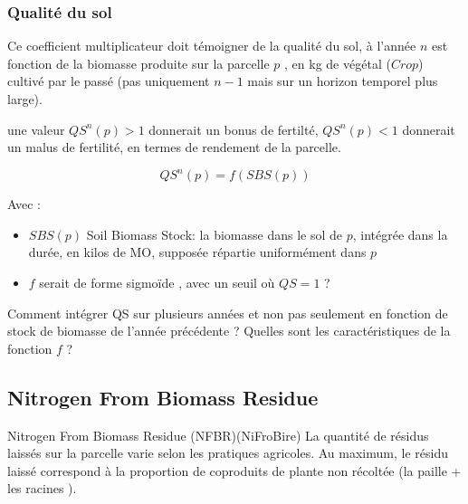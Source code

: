\documentclass[10pt,a4paper,french]{article} %
\begin{document}
\subsubsection{Qualité du sol}

Ce coefficient multiplicateur doit témoigner de la qualité du sol, à l'année $n$ est fonction de la biomasse produite sur la parcelle $p$ , en kg de végétal ($Crop$) cultivé par le passé (pas uniquement $n-1$ mais sur un horizon temporel plus large).

une valeur $QS^n(p)>1$ donnerait un bonus de fertilté, $QS^n(p)<1$ donnerait un malus de fertilité, en termes de rendement de la parcelle.



\begin{equation}
QS^{n}(p) = f(SBS(p))
\end{equation}

Avec  :


\begin{itemize}
  \item  $SBS(p)$ Soil Biomass Stock: la biomasse dans le sol de $p$, intégrée dans la durée, en kilos de MO, supposée répartie uniformément dans $p$
  \item $f$ serait de forme sigmoïde , avec un seuil où $QS=1$ ? 
\end{itemize}




\begin{tcolorbox}[noparskip,
    colback=LimeGreen,colframe=Green,%
    colbacklower=LimeGreen!75!LightGreen,%
    title=Question]
Comment intégrer QS sur plusieurs années et non pas seulement en fonction de stock de biomasse de l'année précédente ? 
Quelles sont les caractéristiques de la fonction $f$ ? 
\end{tcolorbox}










\subsection{Nitrogen From Biomass Residue}


Nitrogen From Biomass Residue (NFBR)(NiFroBire)
La quantité de résidus laissés sur la parcelle varie selon les pratiques agricoles.
Au maximum, le résidu laissé correspond à la proportion de coproduits de  plante non récoltée (la paille + les racines ).
\end{document}
